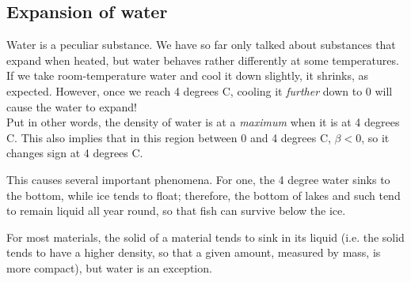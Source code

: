 \subsection{Expansion of water}

Water is a peculiar substance. We have so far only talked about substances that expand when heated, but water behaves rather differently at some temperatures.\\
If we take room-temperature water and cool it down slightly, it shrinks, as expected. However, once we reach 4 degrees C, cooling it \emph{further} down to 0 will cause the water to expand!\\
Put in other words, the density of water is at a \emph{maximum} when it is at 4 degrees C. This also implies that in this region between 0 and 4 degrees C, $\beta < 0$, so it changes sign at 4 degrees C.

This causes several important phenomena. For one, the 4 degree water sinks to the bottom, while ice tends to float; therefore, the bottom of lakes and such tend to remain liquid all year round, so that fish can survive below the ice.

For most materials, the solid of a material tends to sink in its liquid (i.e. the solid tends to have a higher density, so that a given amount, measured by mass, is more compact), but water is an exception.

